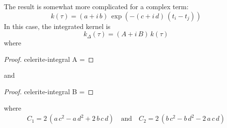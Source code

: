 \documentclass[modern]{aastex62}
\begin{document}
The result is somewhat more complicated for a complex term:
\begin{equation}
k(\tau) = (a + i\,b)\,\exp\left(-(c+i\,d)\,(t_i - t_j)\right)
\end{equation}
In this case, the integrated kernel is
\begin{equation}
k_\Delta(\tau) = (A + i\,B)\,k(\tau)
\end{equation}
where
\begin{proof}{celerite-integral}
  A = 
\end{proof}
and
\begin{proof}{celerite-integral}
  B = 
\end{proof}
where
\begin{eqnarray}
C_1 = 2\,(a\,c^2 - a\,d^2 + 2\,b\,c\,d)
\quad\mathrm{and}\quad
C_2 = 2\,(b\,c^2 - b\,d^2 - 2\,a\,c\,d)
\end{eqnarray}

\newpage

\end{document}
